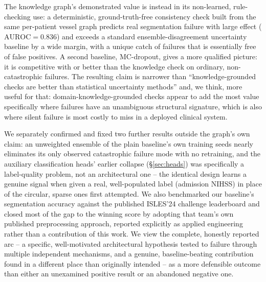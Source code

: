 The knowledge graph's demonstrated value is instead in its non-learned, rule-checking use: a deterministic, ground-truth-free consistency check built from the same per-patient vessel graph predicts real segmentation failure with large effect ($\mathrm{AUROC}=0.836$) and exceeds a standard ensemble-disagreement uncertainty baseline by a wide margin, with a unique catch of failures that is essentially free of false positives. A second baseline, MC-dropout, gives a more qualified picture: it is competitive with or better than the knowledge check on ordinary, non-catastrophic failures. The resulting claim is narrower than ``knowledge-grounded checks are better than statistical uncertainty methods'' and, we think, more useful for that: domain-knowledge-grounded checks appear to add the most value specifically where failures have an unambiguous structural signature, which is also where silent failure is most costly to miss in a deployed clinical system.

We separately confirmed and fixed two further results outside the graph's own claim: an unweighted ensemble of the plain baseline's own training seeds nearly eliminates its only observed catastrophic failure mode with no retraining, and the auxiliary classification heads' earlier collapse (\S\ref{sec:heads}) was specifically a label-quality problem, not an architectural one -- the identical design learns a genuine signal when given a real, well-populated label (admission NIHSS) in place of the circular, sparse ones first attempted. We also benchmarked our baseline's segmentation accuracy against the published ISLES'24 challenge leaderboard and closed most of the gap to the winning score by adopting that team's own published preprocessing approach, reported explicitly as applied engineering rather than a contribution of this work. We view the complete, honestly reported arc -- a specific, well-motivated architectural hypothesis tested to failure through multiple independent mechanisms, and a genuine, baseline-beating contribution found in a different place than originally intended -- as a more defensible outcome than either an unexamined positive result or an abandoned negative one.


